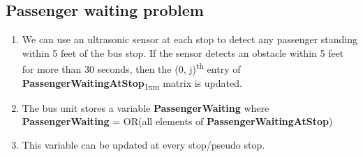 \subsection{Passenger waiting problem}

\begin{enumerate}

    \item We can use an \gls{ultrasonic sensor} at each stop to detect any passenger standing within 5 feet of the bus stop. If the sensor detects an obstacle within 5 feet for more than 30 seconds, then the (0, j)\textsuperscript{th} entry of \textbf{PassengerWaitingAtStop}\textsubscript{1xm} matrix is updated.
    \item The bus unit stores a variable \textbf{PassengerWaiting} where\\
          \textbf{PassengerWaiting} = OR(all elements of \textbf{PassengerWaitingAtStop})
    \item This variable can be updated at every stop/pseudo stop.

\end{enumerate}